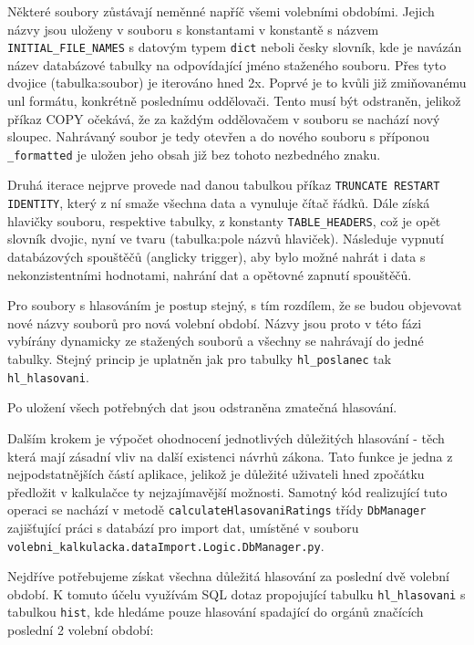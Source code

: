 \par Některé soubory zůstávají neměnné napříč všemi volebními obdobími. Jejich názvy jsou uloženy v souboru s konstantami v konstantě s názvem \texttt{INITIAL\_FILE\_NAMES} s datovým typem \texttt{dict} neboli česky slovník, kde je navázán název databázové tabulky na odpovídající jméno staženého souboru. Přes tyto dvojice (tabulka:soubor) je iterováno hned 2x. Poprvé je to kvůli již zmiňovanému unl formátu, konkrétně poslednímu oddělovači. Tento musí být odstraněn, jelikož příkaz COPY očekává, že za každým oddělovačem v souboru se nachází nový sloupec. Nahrávaný soubor je tedy otevřen a do nového souboru s příponou \texttt{\_formatted} je uložen jeho obsah již bez tohoto nezbedného znaku.
\par Druhá iterace nejprve provede nad danou tabulkou příkaz \texttt{TRUNCATE RESTART IDENTITY}, který z ní smaže všechna data a vynuluje čítač řádků\cite{psql-truncate}. Dále získá hlavičky souboru, respektive tabulky, z konstanty \texttt{TABLE\_HEADERS}, což je opět slovník dvojic, nyní ve tvaru (tabulka:pole názvů hlaviček). Následuje vypnutí databázových spouštěčů (anglicky trigger), aby bylo možné nahrát i data s nekonzistentními hodnotami, nahrání dat a opětovné zapnutí spouštěčů. 

\par Pro soubory s hlasováním je postup stejný, s tím rozdílem, že se budou objevovat nové názvy souborů pro nová volební období. Názvy jsou proto v této fázi vybírány dynamicky ze stažených souborů a všechny se nahrávají do jedné tabulky. Stejný princip je uplatněn jak pro tabulky \texttt{hl\_poslanec} tak \texttt{hl\_hlasovani}.\\

\par Po uložení všech potřebných dat jsou odstraněna zmatečná hlasování.\\ 

\par Dalším krokem je výpočet ohodnocení jednotlivých důležitých hlasování - těch která mají zásadní vliv na další existenci návrhů zákona. Tato funkce je jedna z nejpodstatnějších částí aplikace, jelikož je důležité uživateli hned zpočátku předložit v kalkulačce ty nejzajímavější možnosti. Samotný kód realizující tuto operaci se nachází v metodě \texttt{calculateHlasovaniRatings} třídy \texttt{DbManager} zajišťující práci s databází pro import dat, umístěné v souboru \texttt{volebni\_kalkulacka.dataImport.Logic.DbManager.py}. 
\par Nejdříve potřebujeme získat všechna důležitá hlasování za poslední dvě volební období. K tomuto účelu využívám SQL dotaz propojující tabulku \texttt{hl\_hlasovani} s tabulkou \texttt{hist}, kde hledáme pouze hlasování spadající do orgánů značících poslední 2 volební období:

